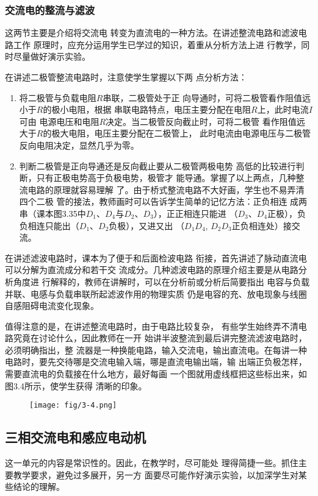 \subsubsection{交流电的整流与滤波}

这两节主要是介绍将交流电
转变为直流电的一种方法。在讲述整流电路和滤波电路工作
原理时，应充分运用学生已学过的知识，着重从分析方法上进
行教学，同时尽量做好演示实验。

在讲述二极管整流电路时，注意使学生掌握以下两
点分析方法：
\begin{enumerate}
\item 将二极管与负载电阻$R$串联，二极管处于正
向导通时，可将二极管看作阻值远小于$R$的极小电阻，根据
串联电路特点，电压主要分配在电阻$R$上，此时电流$I$可由
电源电压和电阻$R$决定。当二极管反向截止时，可将二极管
看作阻值远大于$R$的极大电阻，电压主要分配在二极管上，
此时电流由电源电压与二极管反向电阻决定，显然几乎为零。
\item 判断二极管是正向导通还是反向截止要从二极管两极电势
高低的比较进行判断，只有正极电势高于负极电势，极管才
能导通。掌握了以上两点，几种整流电路的原理就容易理解
了。由于桥式整流电路不大好画，学生也不易弄清四个二极
管的接法，教师画时可以告诉学生简单的记忆方法：正负相连
成两串（课本图3.35中$D_1$、$D_4$与$D_2$、$D_3$），正正相连只能进
（$D_3$、$D_4$正极），负负相连只能出（$D_1$、$D_2$负极），又进又出
（$D_1D_4$, $D_2D_3$正负相连处）接交流。
\end{enumerate}


在讲述滤波电路时，课本为了便于和后面检波电路
衔接，首先讲述了脉动直流电可以分解为直流成分和若干交
流成分。几种滤波电路的原理介绍主要是从电路分析角度进
行解释的，教师在讲解时，可以在分析前或分析后简要指出
电容与负载并联、电感与负载串联所起滤波作用的物理实质
仍是电容的充、放电现象与线圈自感阻碍电流变化现象。

值得注意的是，在讲述整流电路时，由于电路比较复杂，
有些学生始终弄不清电路究竟在讨论什么，因此教师在一开
始讲半波整流到最后讲完整流滤波电路时，必须明确指出，整
流器是一种换能电路，输入交流电，输出直流电。在每讲一种
电路时，要先交待哪是交流电输入端，哪是直流电输出端，输
出端正负极怎样，需要直流电的负载接在什么地方，最好每画
一个图就用虚线框把这些标出来，如图3.4所示，使学生获得
清晰的印象。
\begin{figure}[htp]
    \centering
\texttt{[image: fig/3-4.png]}
    \caption{}
\end{figure}

\subsection{三相交流电和感应电动机}
这一单元的内容是常识性的。因此，在教学时，尽可能处
理得简捷一些。抓住主要教学要求，避免过多展开，另一方
面要尽可能作好演示实验，以加深学生对某些结论的理解。

